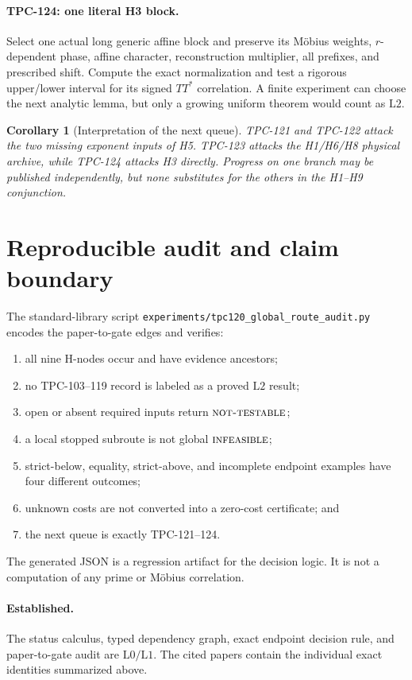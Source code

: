 \documentclass[11pt,a4paper]{article}
\newtheorem{corollary}[theorem]{Corollary}
\theoremstyle{definition}
\theoremstyle{remark}
\newcommand{\Lzero}{\mathrm{L0}}
\newcommand{\Lone}{\mathrm{L1}}
\newcommand{\Ltwo}{\mathrm{L2}}
\newcommand{\INF}{\textnormal{\textsc{infeasible}}}
\newcommand{\NT}{\textnormal{\textsc{not-testable}}}
\begin{document}
\paragraph{TPC-124: one literal H3 block.}
Select one actual long generic affine block and preserve its M\"obius
weights, \(r\)-dependent phase, affine character, reconstruction
multiplier, all prefixes, and prescribed shift.  Compute the exact
normalization and test a rigorous upper/lower interval for its signed
\(TT^*\) correlation.  A finite experiment can choose the next
analytic lemma, but only a growing uniform theorem would count as
\(\Ltwo\).

\begin{corollary}[Interpretation of the next queue]
TPC-121 and TPC-122 attack the two missing exponent inputs of H5.
TPC-123 attacks the H1/H6/H8 physical archive, while TPC-124 attacks
H3 directly.  Progress on one branch may be published independently,
but none substitutes for the others in the H1--H9 conjunction.
\end{corollary}

\section{Reproducible audit and claim boundary}

The standard-library script
\texttt{experiments/tpc120\_global\_route\_audit.py} encodes the
paper-to-gate edges and verifies:
\begin{enumerate}[leftmargin=2em]
\item all nine H-nodes occur and have evidence ancestors;
\item no TPC-103--119 record is labeled as a proved \(\Ltwo\) result;
\item open or absent required inputs return \(\NT\);
\item a local stopped subroute is not global \(\INF\);
\item strict-below, equality, strict-above, and incomplete endpoint
  examples have four different outcomes;
\item unknown costs are not converted into a zero-cost certificate;
  and
\item the next queue is exactly TPC-121--124.
\end{enumerate}
The generated JSON is a regression artifact for the decision logic.
It is not a computation of any prime or M\"obius correlation.

\paragraph{Established.}
The status calculus, typed dependency graph, exact endpoint decision
rule, and paper-to-gate audit are \(\Lzero/\Lone\).  The cited papers
contain the individual exact identities summarized above.
\end{document}
